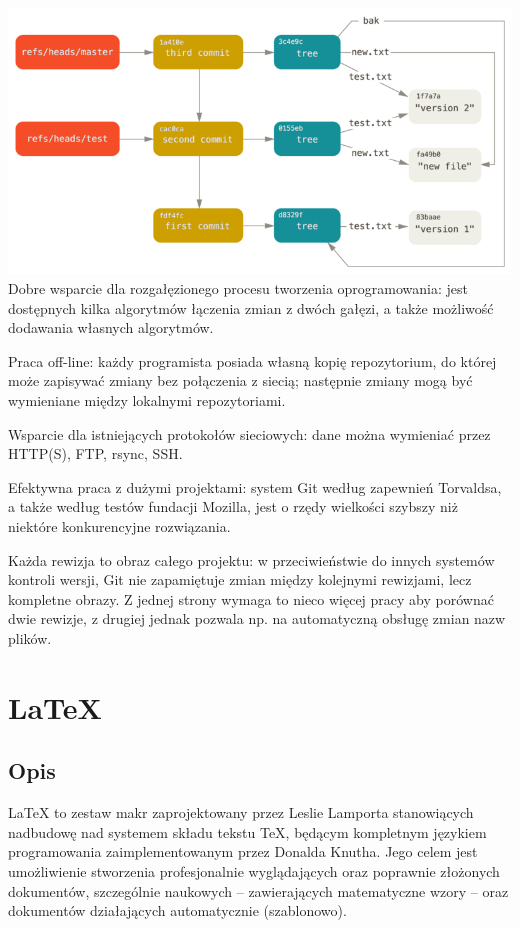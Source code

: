 \documentclass{article}
\begin{document}
\includegraphics[width=1\textwidth]{git.png}
Dobre wsparcie dla rozgałęzionego procesu tworzenia oprogramowania: jest dostępnych kilka algorytmów łączenia zmian z dwóch gałęzi, a także możliwość dodawania własnych algorytmów.

Praca off-line: każdy programista posiada własną kopię repozytorium, do której może zapisywać zmiany bez połączenia z siecią; następnie zmiany mogą być wymieniane między lokalnymi repozytoriami.

Wsparcie dla istniejących protokołów sieciowych: dane można wymieniać przez HTTP(S), FTP, rsync, SSH.

Efektywna praca z dużymi projektami: system Git według zapewnień Torvaldsa, a także według testów fundacji Mozilla, jest o rzędy wielkości szybszy niż niektóre konkurencyjne rozwiązania.

Każda rewizja to obraz całego projektu: w przeciwieństwie do innych systemów kontroli wersji, Git nie zapamiętuje zmian między kolejnymi rewizjami, lecz kompletne obrazy. Z jednej strony wymaga to nieco więcej pracy aby porównać dwie rewizje, z drugiej jednak pozwala np. na automatyczną obsługę zmian nazw plików.

\newpage
\section{LaTeX}
\subsection{Opis}
LaTeX to zestaw makr zaprojektowany przez Leslie Lamporta stanowiących nadbudowę nad systemem składu tekstu TeX, będącym kompletnym językiem programowania zaimplementowanym przez Donalda Knutha. Jego celem jest umożliwienie stworzenia profesjonalnie wyglądających oraz poprawnie złożonych dokumentów, szczególnie naukowych – zawierających matematyczne wzory – oraz dokumentów działających automatycznie (szablonowo).
\end{document}
